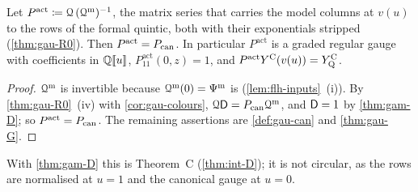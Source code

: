 \begin{cor}
\label{cor:mai-actual}
Let $P^{\mathrm{act}}\coloneqq\mathcal{Q}\,(\mathcal{Q}^{\mathrm m})^{-1}$, the matrix series that carries the model columns at $v(u)$ to the rows of the formal quintic, both with their exponentials stripped (\cref{thm:gau-R0}). Then $P^{\mathrm{act}}=P_{\mathrm{can}}$. In particular $P^{\mathrm{act}}$ is a graded regular gauge with coefficients in $\mathbb{Q}[\![ u ]\!]$, $P^{\mathrm{act}}_{11}(0,z)=1$, and $P^{\mathrm{act}}Y^{\mathrm{C}}(v(u))=Y^{\mathrm{C}}_{\mathrm{Q}}$.
\end{cor}

\begin{proof}
$\mathcal{Q}^{\mathrm m}$ is invertible because $\mathcal{Q}^{\mathrm m}(0)=\Psi^{\mathrm m}$ is (\cref{lem:flh-inputs}~(i)). By \cref{thm:gau-R0}~(iv) with \cref{cor:gau-colours}, $\mathcal{Q}\mathsf{D}=P_{\mathrm{can}}\mathcal{Q}^{\mathrm m}$, and $\mathsf{D}=1$ by \cref{thm:gam-D}; so $P^{\mathrm{act}}=P_{\mathrm{can}}$. The remaining assertions are \cref{def:gau-can} and \cref{thm:gau-G}.
\end{proof}

With \cref{thm:gam-D} this is Theorem~C (\cref{thm:int-D}); it is not circular, as the rows are normalised at $u=1$ and the canonical gauge at $u=0$.


